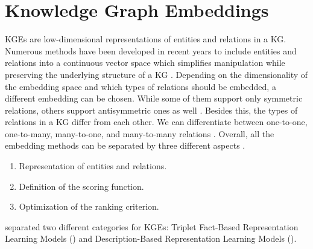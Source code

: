 \section{Knowledge Graph Embeddings} 
\label{sec:knowledge_graph_embeddings}
%
\acfp{KGE} are low-dimensional representations of entities and relations in a \ac{KG}. 
Numerous methods have been developed in recent years to include entities and relations into a continuous vector
space which simplifies manipulation while preserving the underlying structure of a KG \cite{8047276}.
Depending on the dimensionality of the embedding space and which types of relations should be embedded, a different embedding can be chosen.
While some of them support only symmetric relations, others support antisymmetric ones as well \cite{8047276}. 
Besides this, the types of relations in a \ac{KG} differ from each other.
We can differentiate between one-to-one, one-to-many, many-to-one, and many-to-many relations \cite{8047276}.
Overall, all the embedding methods can be separated by three different aspects \cite{electronics9050750}.
\begin{enumerate}
    \item 
    Representation of entities and relations.
    
    \item 
    Definition of the scoring function.
    
    \item 
    Optimization of the ranking criterion.
\end{enumerate}
\cite{electronics9050750} separated two different categories for \acp{KGE}: Triplet Fact-Based Representation Learning Models () and Description-Based Representation Learning Models ().







